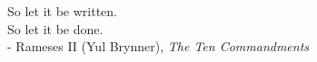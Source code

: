 
\vspace*{\fill}
\begin{center}
So let it be written.\\
So let it be done.\\
- Rameses II (Yul Brynner), \textit{The Ten Commandments}
\end{center}
\vspace*{\fill}
